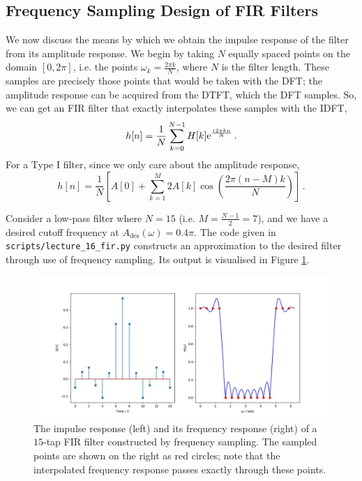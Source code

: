 \subsection{Frequency Sampling Design of FIR Filters}
%
We now discuss the means by which we obtain the impulse response of the filter
from its amplitude response. We begin by taking $N$ equally spaced points on
the domain $[0,2\pi]$, i.e. the points $\omega_k = \frac{2\pi k}{N}$, where $N$
is the filter length. These samples are precisely those points that would be
taken with the DFT; the amplitude response can be acquired from the DTFT, which
the DFT samples. So, we can get an FIR filter that exactly interpolates these
samples with the IDFT,
%
\begin{displaymath}
  h[n] = \frac{1}{N}\sum_{k=0}^{N-1}H[k]\mathrm{e}^{\frac{{i\mkern1mu} 2\pi k n}{N}} \,.
\end{displaymath}
%
For a Type I filter, since we only care about the amplitude response,
%
\begin{displaymath}
  h[n] = \frac{1}{N}\left[
    A[0] + \sum_{k=1}^M 2A[k]\cos\left(\frac{2\pi(n-M)k}{N}\right)
  \right] \,.
\end{displaymath}
%
\begin{exmp}
  Consider a low-pass filter where $N=15$ (i.e. $M = \frac{N-1}{2} = 7$), and we
  have a desired cutoff frequency at $A_\mathrm{des}(\omega) = 0.4\pi$. The
  code given in \texttt{scripts/lecture\_16\_fir.py} constructs an approximation
  to the desired filter through use of frequency sampling. Its output is visualised
  in Figure \ref{fig::lecture_16_fir}.
  \begin{figure}[!htb]
    \includegraphics[width=\textwidth]{images/lecture_16_fir.JPG}
    \caption{The impulse response (left) and its frequency response
      (right) of a $15$-tap FIR filter constructed by frequency sampling.
      The sampled points are shown on the right as red circles; note that
      the interpolated frequency response passes exactly through these
      points.
    }
    \label{fig::lecture_16_fir}
  \end{figure}
\end{exmp}
